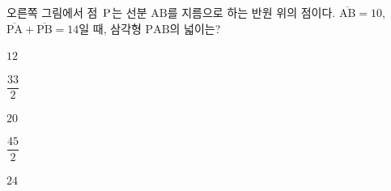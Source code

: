 \noindent\begin{minipage}[t]{0.58\linewidth}\vspace{0pt}\raggedright 오른쪽 그림에서 점~$\mathrm{P}$는 선분 $\mathrm{AB}$를 지름으로 하는 반원 위의 점이다. $\overline{\mathrm{AB}}=10$, $\overline{\mathrm{PA}}+\overline{\mathrm{PB}}=14$일 때, 삼각형 $\mathrm{PAB}$의 넓이는?\end{minipage}\hfill\begin{minipage}[t]{0.4\linewidth}\vspace{0pt}\centering \resizebox{\ifdim\width>\linewidth\linewidth\else\width\fi}{!}{}\end{minipage}\par
\begin{choices32}{\rule[-3ex]{0pt}{8ex}$12$}{\rule[-3ex]{0pt}{8ex}$\dfrac{33}{2}$}{\rule[-3ex]{0pt}{8ex}$20$}{\rule[-3ex]{0pt}{8ex}$\dfrac{45}{2}$}{\rule[-3ex]{0pt}{8ex}$24$}\end{choices32}
